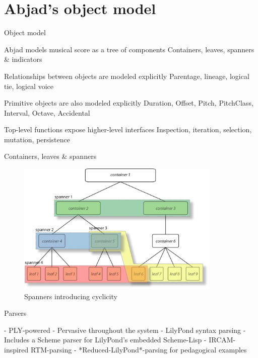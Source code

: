 \section{Abjad's object model}

\begin{frame}{Object model}
    \begin{block}
        {Abjad models musical score as a tree of components}
        Containers, leaves, spanners \& indicators
    \end{block}
    \begin{block}
        {Relationships between objects are modeled explicitly}
        Parentage, lineage, logical tie, logical voice
    \end{block}
    \begin{block}
        {Primitive objects are also modeled explicitly}
        Duration, Offset, Pitch, PitchClass, Interval, Octave, Accidental
    \end{block}
    \begin{block}
        {Top-level functions expose higher-level interfaces}
        Inspection, iteration, selection, mutation, persistence
    \end{block}
\end{frame}

\begin{frame}{Containers, leaves \& spanners}
    \begin{figure}
    \begin{centering}
        \includegraphics[height=2.5in]{assets/include-container-spanner.png}
    \caption{Spanners introducing cyclicity}
    \end{centering}
    \end{figure}
\end{frame}

\begin{frame}[fragile]{Parsers}
\begin{markdown}
- PLY-powered
- Pervasive throughout the system
- LilyPond syntax parsing
    - Includes a Scheme parser for LilyPond's embedded Scheme-Lisp
- IRCAM-inspired RTM-parsing
- *Reduced-LilyPond*-parsing for pedagogical examples
\end{markdown}
\end{frame}

